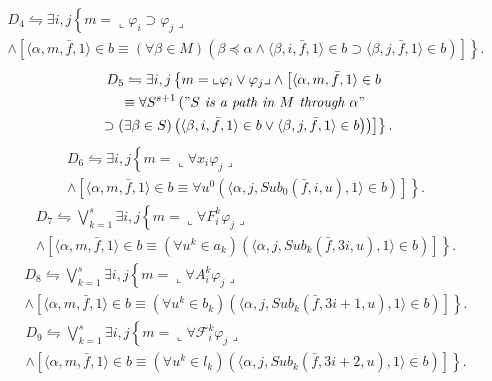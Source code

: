 \documentclass{asl}
\theoremstyle{definition}
\begin{document}
\begin{multline*}
D_4\leftrightharpoons \exists i,j\left\lbrace m=\llcorner \varphi_i \supset \varphi_j\lrcorner 
\right.
\\
\left.
\wedge \left[\langle\alpha, m,\bar{f},1\rangle \in b \equiv 
(\forall\beta\in M)(\beta\preceq\alpha\wedge\langle\beta, i,\bar{f},1\rangle \in b\supset\langle\beta, j,\bar{f},1\rangle \in b)\right] 
\right\rbrace. 
\end{multline*}
\begin{multline*}
D_5\leftrightharpoons \exists i,j\left\lbrace m=\llcorner \varphi_i \vee \varphi_j\lrcorner 
\wedge \left[\langle\alpha, m,\bar{f},1\rangle \in b  
\right.
\right.
\\
\left.
\left.
\equiv 
\forall S^{s+1}\left("S\textit{ is a path in }M\textit{ through }\alpha" 
\right.
\right.
\right.
\\
\left.
\left.
\left.
\supset(\exists\beta\in S)\left(\langle \beta,i,\bar{f},1\rangle \in b\vee\langle \beta,j,\bar{f},1\rangle \in b\right) \right)
\right]\right\rbrace. 
\end{multline*}
\begin{multline*}
D_6\leftrightharpoons \exists i,j\left\lbrace m=\llcorner\forall x_i \varphi_j\lrcorner 
\right.
\\
\left.
\wedge \left[\langle\alpha, m,\bar{f},1\rangle \in b \equiv 
\forall u^0
\left(\langle \alpha,j,
Sub_0(\bar{f},i,u),1\rangle \in b \right)  \right] 
\right\rbrace. 
\end{multline*}
\begin{multline*}
D_7\leftrightharpoons \bigvee_{k=1}^s
\exists i,j\left\lbrace m=\llcorner\forall F_i^k \varphi_j\lrcorner 
\right.
\\
\left.
\wedge \left[\langle\alpha, m,\bar{f},1\rangle \in b \equiv 
(\forall u^k\in a_k)
\left(\langle \alpha,j,
Sub_k(\bar{f},3i,u),1\rangle \in b \right)  \right] 
\right\rbrace. 
\end{multline*}
\begin{multline*}
D_8\leftrightharpoons \bigvee_{k=1}^s
\exists i,j\left\lbrace m=\llcorner\forall A_i^k \varphi_j\lrcorner 
\right.
\\
\left.
\wedge \left[\langle\alpha, m,\bar{f},1\rangle \in b \equiv 
(\forall u^k\in b_k)
\left(\langle \alpha,j,
Sub_k(\bar{f},3i+1,u),1\rangle \in b \right)  \right] 
\right\rbrace. 
\end{multline*}
\begin{multline*}
D_9\leftrightharpoons \bigvee_{k=1}^s
\exists i,j\left\lbrace m=\llcorner\forall \mathcal{F}_i^k \varphi_j\lrcorner 
\right.
\\
\left.
\wedge \left[\langle\alpha, m,\bar{f},1\rangle \in b \equiv 
(\forall u^k\in l_k)
\left(\langle \alpha,j,
Sub_k(\bar{f},3i+2,u),1\rangle \in b \right)  \right] 
\right\rbrace. 
\end{multline*}
\end{document}
